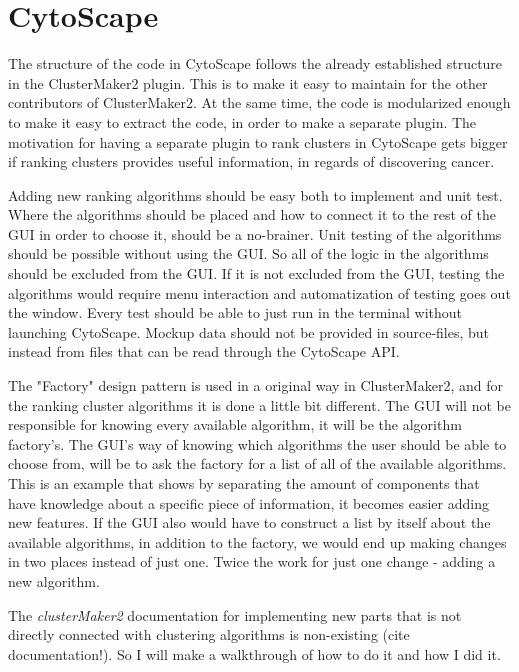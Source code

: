 \documentclass[UKenglish]{ifimaster}
\begin{document}
\part{CytoScape} %
The structure of the code in CytoScape follows the already established structure in the ClusterMaker2 plugin. This is to
make it easy to maintain for the other contributors of ClusterMaker2. At the same time, the code is modularized enough
to make it easy to extract the code, in order to make a separate plugin. The motivation for having a separate plugin to
rank clusters in CytoScape gets bigger if ranking clusters provides useful information, in regards of discovering
cancer.

Adding new ranking algorithms should be easy both to implement and unit test. Where the algorithms should be placed and
how to connect it to the rest of the GUI in order to choose it, should be a no-brainer. Unit testing of the algorithms
should be possible without using the GUI. So all of the logic in the algorithms should be excluded from the GUI. If it
is not excluded from the GUI, testing the algorithms would require menu interaction and automatization of testing goes
out the window. Every test should be able to just run in the terminal without launching CytoScape. Mockup data %
should not be provided in source-files, but instead from files that can be read through the CytoScape API. %

The "Factory" design pattern %
is used in a original way in ClusterMaker2, and for the ranking cluster algorithms it is done a little bit different.
The GUI will not be responsible for knowing every available algorithm, it will be the algorithm factory's. The GUI's way
of knowing which algorithms the user should be able to choose from, will be to ask the factory for a list of all of the
available algorithms. This is an example that shows by separating the amount of components that have knowledge about a
specific piece of information, it becomes easier adding new features. If the GUI also would have to construct a list by
itself about the available algorithms, in addition to the factory, we would end up making changes in two places instead
of just one. Twice the work for just one change - adding a new algorithm.


The \textit{clusterMaker2} documentation for implementing new parts that is not directly connected with clustering
algorithms is non-existing (cite documentation!). So I will make a walkthrough of how to do it and how I did it.
\end{document}
